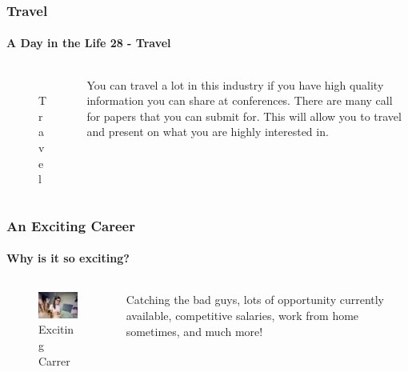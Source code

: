 \documentclass[aspectratio=169]{beamer}
\begin{document}
\begin{frame}
  \frametitle{Travel}
  \framesubtitle{A Day in the Life 28 - Travel}
  \begin{columns}[onlytextwidth]
    \begin{column}{.30\textwidth}
      \begin{figure}
        \includegraphics[width=5.5cm,keepaspectratio]{travel}
        \caption{Travel}
      \end{figure}
    \end{column}
    \hfill
    \begin{column}{.60\textwidth}
        \begin{tcolorbox}[title=travel.log,colback=gray]
          You can travel a lot in this industry if you have high quality information you can share at conferences. There are many call for papers that you can submit for. This will allow you to travel and present on what you are highly interested in.
        \end{tcolorbox}
    \end{column}
  \end{columns}
\end{frame}

\begin{frame}
  \frametitle{An Exciting Career}
  \framesubtitle{Why is it so exciting?}
  \begin{columns}[onlytextwidth]
    \begin{column}{.30\textwidth}
      \begin{figure}
        \includegraphics[width=5.5cm,keepaspectratio]{exciting}
        \caption{Exciting Carrer}
      \end{figure}
    \end{column}
    \hfill
    \begin{column}{.60\textwidth}
        \begin{tcolorbox}[title=exciting.log,colback=gray]
          Catching the bad guys, lots of opportunity currently available, competitive salaries, work from home sometimes, and much more!
        \end{tcolorbox}
    \end{column}
  \end{columns}
\end{frame}
\end{document}
